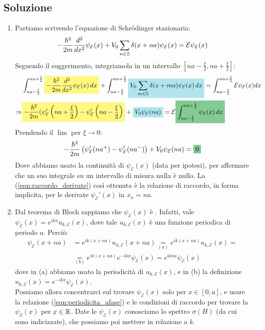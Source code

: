 \documentclass[../../FisicaTeorica.tex]{subfiles}
\begin{document}
\subsection{Soluzione}
\begin{enumerate}
\item Partiamo scrivendo l'equazione di Schr\"odinger stazionaria:
\begin{align*}
-\frac{\hbar^2}{2m}\frac{d^2}{dx^2} \psi_\mathcal{E}(x) + V_0 \sum_{n\in \mathbb{Z}} \delta(x+na) \psi_\mathcal{E}(x) = \mathcal{E}\psi_\mathcal{E}(x)
\end{align*}
Seguendo il suggerimento, integriamola in un intervallo $\left[na-\frac{\xi}{2}, na+\frac{\xi}{2}\right]$:
\begin{align*}
&\int_{na-\frac{\xi}{2}}^{na+\frac{\xi}{2}} \hlc{Yellow}{-\frac{\hbar^2}{2m}\frac{d^2}{dx^2} \psi_\mathcal{E}(x)\, dx} + \int_{na-\frac{\xi}{2}}^{na+\frac{\xi}{2}} \hlc{SkyBlue}{V_0 \sum_{m\in \bb{Z}} \delta(x+ma)\psi_\mathcal{E}(x)\,dx} = \int_{na-\frac{\xi}{2}}^{na+\frac{\xi}{2}} \mathcal{E}\psi_\mathcal{E}(x) dx\\
\Rightarrow &\hlc{Yellow}{-\frac{\hbar^2}{2m}(\psi'_\mathcal{E}\left(na + \frac{\xi}{2}\right)-\psi_\mathcal{E}'\left(na-\frac{\xi}{2}\right)}
+\hlc{SkyBlue}{V_0 \psi_\mathcal{E}(na)} = \mathcal{E}\hlc{ForestGreen}{\int_{na-\frac{\xi}{2}}^{na+\frac{\xi}{2}} \psi_\mathcal{E}(x)\,dx}
\end{align*}
Prendendo il $\lim$ per $\xi \to 0$:
\begin{align}
-\frac{\hbar^2}{2m}\left(\psi_\mathcal{E}'(na^+)-\psi_\mathcal{E}'(na^-)\right) + V_0\psi_\mathcal{E}(na) = \hlc{ForestGreen}{0}
\label{eqn:raccordo_derivate}
\end{align}
Dove abbiamo usato la continuità di $\psi_\mathcal{E}(x)$ (data per ipotesi), per affermare che un suo integrale su un intervallo di misura nulla è nullo. La (\ref{eqn:raccordo_derivate}) così ottenuta è la relazione di raccordo, in forma implicita, per le derivate $\psi_\mathcal{E}'(x)$ in $x_n = na$.
\item Dal teorema di Bloch sappiamo che $\psi_\mathcal{E}(x)$ è . Infatti, vale $\psi_\mathcal{E}(x) = e^{ikx} u_{k,\mathcal{E}}(x)$, dove tale $u_{k,\mathcal{E}}(x)$ è una funzione periodica di periodo $a$. Perciò:
\begin{align}\nonumber
\psi_{\mathcal{E}}(x+na) &= e^{ik(x+na)}u_{k, \mathcal{E}}(x+na) \underset{(a)}{=} e^{ik(x+na)}u_{k,\mathcal{E}}(x)=\\
&\underset{(b)}{=} e^{ik(x+na)} e^{-ikx} \psi_\mathcal{E}(x) = e^{ikna}\psi_\mathcal{E}(x)
\label{eqn:periodicita_afase}
\end{align}
dove in (a) abbiamo usato la periodicità di $u_{k,\mathcal{E}}(x)$, e in (b) la definizione $u_{k,\mathcal{E}}(x) = e^{-ikx}\psi_\mathcal{E}(x)$.\\
Possiamo allora concentrarci sul trovare $\psi_\mathcal{E}(x)$ solo per $x \in [0,a]$, e usare la relazione (\ref{eqn:periodicita_afase}) e le condizioni di raccordo per trovare la $\psi_\mathcal{E}(x)$ per $x\in \mathbb{R}$. Date le $\psi_\mathcal{E}(x)$ conosciamo lo spettro $\sigma(H)$ (da cui sono indicizzate), che possiamo poi mettere in relazione a $k$.\\


\end{enumerate}
\end{document}
